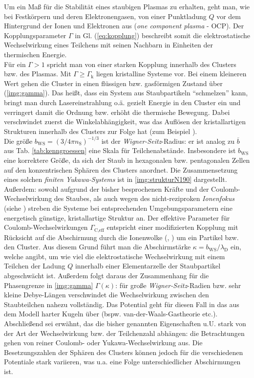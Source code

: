 \documentclass[numbers=noenddot,a4paper,notitlepage,twoside,BCOR15mm]{scrbook}
\newcommand{\ix}[1]{_\text{#1}}
\newcommand{\tilt}[1]{\textit{#1}}
\begin{document}
					 Um ein Maß für die Stabilität eines staubigen Plasmas zu erhalten, geht man, wie bei Festkörpern und deren Elektronengasen, von einer Punktladung $Q$ vor dem Hintergrund der Ionen und Elektronen aus (\tilt{one component plasma} - OCP). Der Kopplungsparameter $\Gamma$ in Gl. (\ref{eq:kopplung}) beschreibt somit die elektrostatische Wechselwirkung eines Teilchens mit seinen Nachbarn in Einheiten der thermischen Energie.\\
					Für ein $\Gamma>1$ spricht man von einer starken Kopplung innerhalb des Clusters bzw. des Plasmas. Mit $\Gamma\geq\Gamma\ix{k}$ liegen kristalline Systeme vor. Bei einem kleineren Wert gehen die Cluster in einen flüssigen bzw. gasförmigen Zustand über (\ref{img:gamma}). Das heißt, dass ein System aus Staubpartikeln "`schmelzen"' kann, bringt man durch Lasereinstrahlung o.ä. gezielt Energie in den Cluster ein und verringert damit die Ordnung bzw. erhöht die thermische Bewegung. Dabei verschwindet zuerst die Winkelabhängigkeit, was das Auflösen der kristallartigen Strukturen innerhalb des Clusters zur Folge hat (zum Beispiel \cite{Thomas96}).\\
					Die größe $b\ix{WS}=\left(3/4\pi n\ix{S}\right)^{-1/3}$ ist der \tilt{Wigner-Seitz}-Radius: er ist analog zu $\overline{b}$ aus Tab. \ref{tab:kenngroessen} eine Skala für Teilchenabstände. Insbesondere ist $b\ix{WS}$ eine korrektere Größe, da sich der Staub in hexagonalen bzw. pentagonalen Zellen auf den konzentrischen Sphären des Clusters anordnet. Die Zusammensetzung eines solchen \tilt{finiten Yukawa-Systems} ist in \ref{img:strukturN190} dargestellt. Außerdem: sowohl aufgrund der bisher besprochenen Kräfte und der Coulomb-Wechselwirkung des Staubes, als auch wegen des nicht-reziproken \tilt{Ionenfokus} (siehe \cite{Melzer95c}) streben die Systeme bei entsprechenden Umgebungsparametern eine energetisch günstige, kristallartige Struktur an.  Der effektive Parameter für Coulomb-Wechselwirkungen $\Gamma\ix{C,eff}$ entspricht einer modifizierten Kopplung mit Rücksicht auf die Abschirmung durch die Ionenwolke (\cite{Lampe00}, \cite{Schweigert00d}) um ein Partikel bzw. den Cluster. Aus diesem Grund führt man die Abschirmstärke $\kappa=b\ix{WS}/\lambda\ix{D}$ ein, welche angibt, um wie viel die elektrostatische Wechselwirkung mit einem Teilchen der Ladung $Q$ innerhalb einer Elementarzelle der Staubpartikel abgeschwächt ist. Außerdem folgt daraus der Zusammenhang für die Phasengrenze in \ref{img:gamma} $\Gamma\left(\kappa\right)$: für große \tilt{Wigner-Seitz}-Radien bzw. sehr kleine Debye-Längen verschwindet die Wechselwirkung zwischen den Staubteilchen nahezu vollständig. Das Potential geht für diesen Fall in das aus dem Modell harter Kugeln über (bspw. van-der-Waals-Gastheorie etc.).\\
					Abschließend sei erwähnt, das die bisher genannten Eigenschaften u.U. stark von der Art der Wechselwirkung bzw. der Teilchenzahl abhängen: die Betrachtungen gehen von reiner Coulomb- oder Yukawa-Wechselwirkung aus. Die Besetzungszahlen der Sphären des Clusters können jedoch für die verschiedenen Potentiale stark variieren, was u.a. eine Folge unterschiedlicher Abschirmungen ist.
\end{document}

